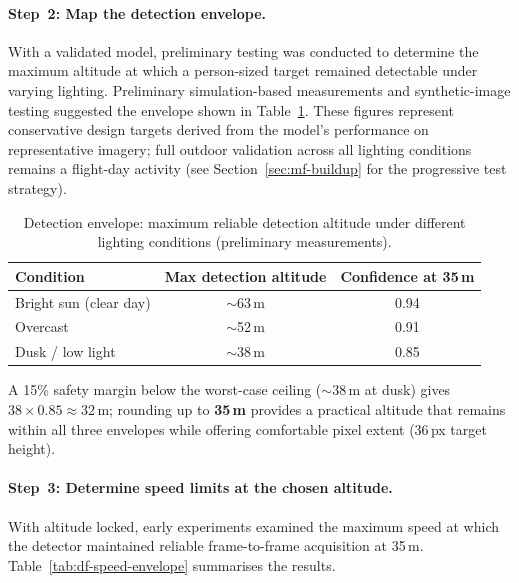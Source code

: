 \paragraph{Step~2: Map the detection envelope.}
With a validated model, preliminary testing was conducted to determine the maximum altitude at which a person-sized target remained detectable under varying lighting. Preliminary simulation-based measurements and synthetic-image testing suggested the envelope shown in Table~\ref{tab:df-detection-envelope}. These figures represent conservative design targets derived from the model's performance on representative imagery; full outdoor validation across all lighting conditions remains a flight-day activity (see Section~\ref{sec:mf-buildup} for the progressive test strategy).

\begin{table}[H]
  \centering\compactTable
  \caption{Detection envelope: maximum reliable detection altitude under different lighting conditions (preliminary measurements).}\label{tab:df-detection-envelope}
  \begin{tabularx}{\linewidth}{@{}l c c@{}}
    \toprule
    \textbf{Condition} & \textbf{Max detection altitude} & \textbf{Confidence at 35\,m} \\
    \midrule
    Bright sun (clear day) & $\sim$63\,m & 0.94 \\
    Overcast              & $\sim$52\,m & 0.91 \\
    Dusk / low light      & $\sim$38\,m & 0.85 \\
    \bottomrule
  \end{tabularx}
\end{table}

A 15\% safety margin below the worst-case ceiling ($\sim$38\,m at dusk) gives $38 \times 0.85 \approx 32$\,m; rounding up to \textbf{35\,m} provides a practical altitude that remains within all three envelopes while offering comfortable pixel extent (36\,px target height).

\paragraph{Step~3: Determine speed limits at the chosen altitude.}
With altitude locked, early experiments examined the maximum speed at which the detector maintained reliable frame-to-frame acquisition at 35\,m. Table~\ref{tab:df-speed-envelope} summarises the results.

